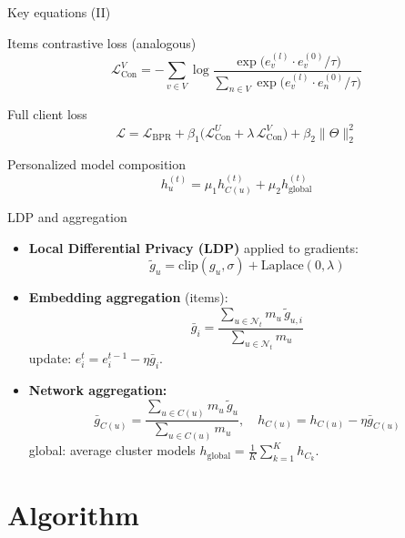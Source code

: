 \documentclass{beamer}
\begin{document}
\begin{frame}{Key equations (II)}
\small
\hypertarget{eq:eqn}{}
  \begin{block}{Items contrastive loss (analogous)}
    \[
    \mathcal{L}_{\text{Con}}^{V} = -\sum_{v\in V}\log \frac{\exp\big(e_v^{(l)}\cdot e_v^{(0)}/\tau\big)}
    {\sum_{n\in V}\exp\big(e_v^{(l)}\cdot e_n^{(0)}/\tau\big)}
    \]
  \end{block}
  \begin{block}{Full client loss}
    \[
      \mathcal{L} = \mathcal{L}_{\text{BPR}} + \beta_1\big(\mathcal{L}_{\text{Con}}^{U} + \lambda \,\mathcal{L}_{\text{Con}}^{V}\big) + \beta_2\|\Theta\|_2^2
    \]
  \end{block}
  \begin{block}{Personalized model composition}
    \[
      h_u^{(t)} = \mu_1 h_{C(u)}^{(t)} + \mu_2 h_{\text{global}}^{(t)}
    \]
  \end{block}
\end{frame}



\begin{frame}{LDP and aggregation}
\small
  \begin{itemize}
    \item \textbf{Local Differential Privacy (LDP)} applied to gradients:
      \hypertarget{eq:ldp}{}
      \[
        \tilde g_u = \mathrm{clip}(g_u,\sigma) + \mathrm{Laplace}(0,\lambda)
      \]
    \item \textbf{Embedding aggregation} (items):
      \[
        \bar g_i = \frac{\sum_{u\in \mathcal{N}_t} m_u \,\tilde g_{u,i}}{\sum_{u\in \mathcal{N}_t} m_u}
      \]
      update: $e_i^{t}=e_i^{t-1}-\eta \bar g_i$.
    \item \textbf{Network aggregation:}
      \[
        \bar g_{C(u)} = \frac{\sum_{u\in C(u)} m_u\,\tilde g_u}{\sum_{u\in C(u)} m_u},\quad
        h_{C(u)} = h_{C(u)} - \eta \bar g_{C(u)}
      \]
      global: average cluster models $h_{\text{global}} = \frac{1}{K}\sum_{k=1}^K h_{C_k}$.
  \end{itemize}
\end{frame}

\section{Algorithm}
\end{document}
